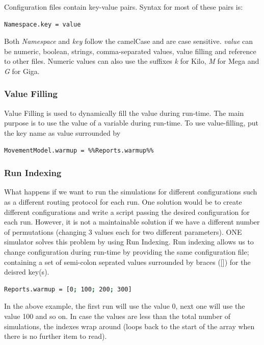 Configuration files contain key-value pairs. Syntax for most of these pairs is:
\begin{lstlisting}[language=bash]
Namespace.key = value
\end{lstlisting}

Both \textit{Namespace} and \textit{key} follow the camelCase and are case sensitive. \textit{value} can be numeric, boolean, strings, comma-separated values, value filling and reference to other files. Numeric values can also use the suffixes \textit{k} for Kilo, \textit{M} for Mega and \textit{G} for Giga. 

\subsubsection{Value Filling} 
Value Filling is used to dynamically fill the value during run-time. The main purpose is to use the value of a variable during run-time. To use value-filling, put the key name as value surrounded by %
\begin{lstlisting}[language=bash]
MovementModel.warmup = %%Reports.warmup%%
\end{lstlisting}
\subsubsection{Run Indexing} 
What happens if we want to run the simulations for different configurations such as a different routing protocol for each run. One solution would be to create different configurations and write a script passing the desired configuration for each run. However, it is not a maintainable solution if we have a different number of permutations (changing 3 values each for two different parameters). ONE simulator solves this problem by using Run Indexing. Run indexing allows us to change configuration during run-time by providing the same configuration file;  containing a set of semi-colon seprated values surrounded by braces ([]) for the deisred key(s).

\begin{lstlisting}[language=bash]
Reports.warmup = [0; 100; 200; 300]
\end{lstlisting}

In the above example, the first run will use the value 0, next one will use the value 100 and so on. In case the values are less than the total number of simulations, the indexes wrap around (loops back to the start of the array when there is no further item to read).
\newpage

